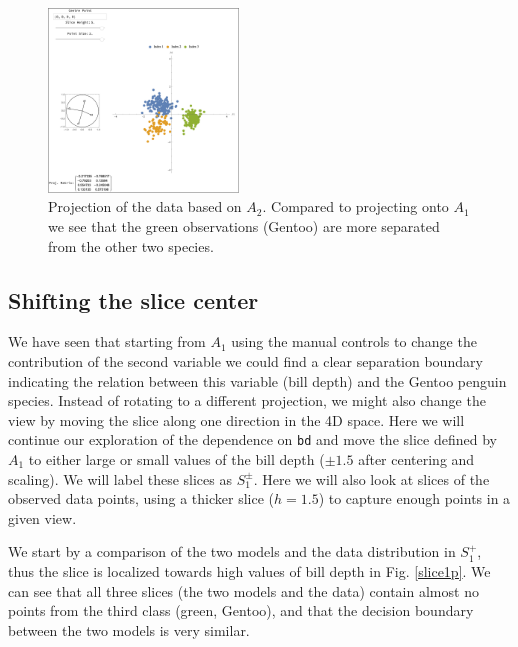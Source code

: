\documentclass[]{interact}
\theoremstyle{plain}%
\theoremstyle{definition}
\theoremstyle{remark}
\begin{document}
\begin{figure}[ht]
\centerline{\includegraphics[width=0.45\textwidth]{figures/proj2_data.png}}
\caption{Projection of the data based on $A_2$. Compared to projecting onto $A_1$ we see that the green observations (Gentoo) are more separated from the other two species.}
\label{proj2}
\end{figure}

\hypertarget{shifting-the-slice-center}{%
\subsection{Shifting the slice center}\label{shifting-the-slice-center}}

We have seen that starting from \(A_1\) using the manual controls to
change the contribution of the second variable we could find a clear
separation boundary indicating the relation between this variable (bill
depth) and the Gentoo penguin species. Instead of rotating to a
different projection, we might also change the view by moving the slice
along one direction in the 4D space. Here we will continue our
exploration of the dependence on \texttt{bd} and move the slice defined
by \(A_1\) to either large or small values of the bill depth
(\(\pm 1.5\) after centering and scaling). We will label these slices as
\(S_1^{\pm}\). Here we will also look at slices of the observed data
points, using a thicker slice (\(h=1.5\)) to capture enough points in a
given view.

We start by a comparison of the two models and the data distribution in
\(S_1^{+}\), thus the slice is localized towards high values of bill
depth in Fig. \ref{slice1p}. We can see that all three slices (the two
models and the data) contain almost no points from the third class
(green, Gentoo), and that the decision boundary between the two models
is very similar.
\end{document}
